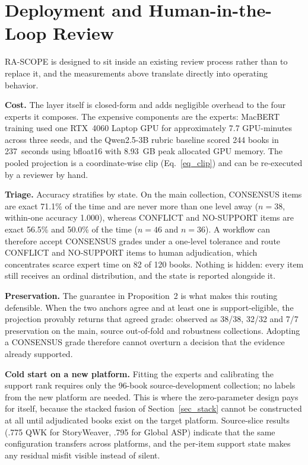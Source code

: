 \documentclass[conference]{IEEEtran}
\begin{document}
\section{Deployment and Human-in-the-Loop Review}
\label{sec_deploy}

RA-SCOPE is designed to sit inside an existing review process rather than to
replace it, and the measurements above translate directly into operating
behavior.

\noindent\textbf{Cost.} The layer itself is closed-form and adds negligible
overhead to the four experts it composes. The expensive components are the
experts: MacBERT training used one RTX~4060 Laptop GPU for approximately 7.7
GPU-minutes across three seeds, and the Qwen2.5-3B rubric baseline scored 244
books in 237~seconds using bfloat16 with 8.93~GB peak allocated GPU memory. The
pooled projection is a coordinate-wise clip (Eq.~\ref{eq_clip}) and can be
re-executed by a reviewer by hand.

\noindent\textbf{Triage.} Accuracy stratifies by state. On the main collection,
CONSENSUS items are exact 71.1\% of the time and are never more than one level
away ($n{=}38$, within-one accuracy 1.000), whereas CONFLICT and NO-SUPPORT
items are exact 56.5\% and 50.0\% of the time ($n{=}46$ and $n{=}36$). A
workflow can therefore accept CONSENSUS grades under a one-level tolerance and
route CONFLICT and NO-SUPPORT items to human adjudication, which concentrates
scarce expert time on 82 of 120 books. Nothing is hidden: every item still
receives an ordinal distribution, and the state is reported alongside it.

\noindent\textbf{Preservation.} The guarantee in Proposition~2 is what makes this
routing defensible. When the two anchors agree and at least one is
support-eligible, the projection provably returns that agreed grade: observed
as 38/38, 32/32 and 7/7 preservation on the main, source out-of-fold and
robustness collections. Adopting a CONSENSUS grade therefore cannot overturn a
decision that the evidence already supported.

\noindent\textbf{Cold start on a new platform.} Fitting the experts and
calibrating the support rank requires only the 96-book source-development
collection; no labels from the new platform are needed. This is where the
zero-parameter design pays for itself, because the stacked fusion of
Section~\ref{sec_stack} cannot be constructed at all until adjudicated books
exist on the target platform. Source-slice results
(.775 QWK for StoryWeaver, .795 for Global ASP) indicate that the same
configuration transfers across platforms, and the per-item support state makes
any residual misfit visible instead of silent.
\end{document}
